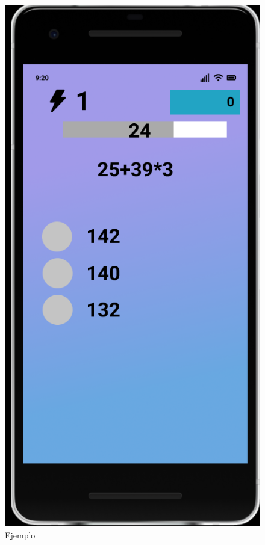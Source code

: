\documentclass{article}
\begin{document}
\begin{figure}[H]
    \centering
    \includegraphics[scale=0.9]{imgs/Figma/Ejemplo}
    \caption{Ejemplo}
\end{figure}
\end{document}
